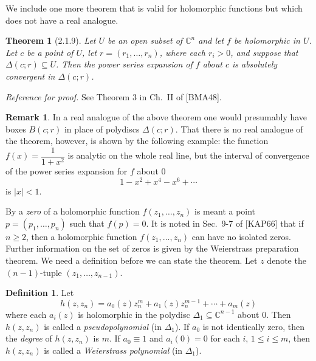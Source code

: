 \documentclass[11pt]{article}
\theoremstyle{plain}
\newtheorem*{theorem*}{Theorem}
\theoremstyle{definition}
\newtheorem*{definition}{Definition}
\newtheorem*{remark}{Remark}
\newcommand{\C}{\mathbb{C}}
\begin{document}
We include one more theorem that is valid for holomorphic functions but
which does not have a real analogue.

\begin{theorem*}[2.1.9]
Let $U$ be an open subset of $\C^n$ and let $f$ be holomorphic in $U$.
Let $c$ be a point of $U$, let $r = (r_1, \ldots, r_n)$, where each
$r_i > 0$, and suppose that $\Delta(c;r) \subseteq U$. Then the power
series expansion of $f$ about $c$ is absolutely convergent in
$\Delta(c;r)$.
\end{theorem*}

\textit{Reference for proof.} See Theorem 3 in Ch.~II of [BMA48].

\begin{remark}
In a real analogue of the above theorem one would presumably have boxes
$B(c;r)$ in place of polydiscs $\Delta(c;r)$. That there is no real
analogue of the theorem, however, is shown by the following example: the
function $f(x) = \dfrac{1}{1 + x^2}$ is analytic on the whole real line,
but the interval of convergence of the power series expansion for $f$
about $0$
\[
1 - x^2 + x^4 - x^6 + \cdots
\]
is $|x| < 1$.
\end{remark}

By a \emph{zero} of a holomorphic function $f(z_1, \ldots, z_n)$ is meant
a point $p = (p_1, \ldots, p_n)$ such that $f(p) = 0$. It is noted in
Sec.~9-7 of [KAP66] that if $n \ge 2$, then a holomorphic function
$f(z_1, \ldots, z_n)$ can have no isolated zeros. Further information on
the set of zeros is given by the Weierstrass preparation theorem. We
need a definition before we can state the theorem. Let $z$ denote the
$(n-1)$-tuple $(z_1, \ldots, z_{n-1})$.

\begin{definition}
Let
\begin{equation}
h(z, z_n) = a_0(z) z_n^m + a_1(z) z_n^{m-1} + \cdots + a_m(z)
\tag{2.1.6}
\end{equation}
where each $a_i(z)$ is holomorphic in the polydisc
$\Delta_1 \subseteq \C^{n-1}$ about $0$. Then $h(z, z_n)$ is called a
\emph{pseudopolynomial} (in $\Delta_1$). If $a_0$ is not identically
zero, then the \emph{degree} of $h(z, z_n)$ is $m$. If $a_0 \equiv 1$ and
$a_i(0) = 0$ for each $i$, $1 \le i \le m$, then $h(z, z_n)$ is called a
\emph{Weierstrass polynomial} (in $\Delta_1$).
\end{definition}
\end{document}
